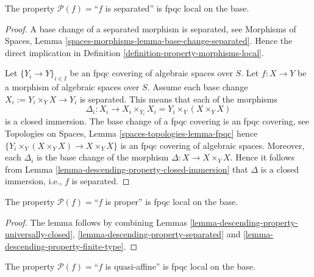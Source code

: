 \begin{lemma}
\label{lemma-descending-property-separated}
The property $\mathcal{P}(f) =$``$f$ is separated''
is fpqc local on the base.
\end{lemma}

\begin{proof}
A base change of a separated morphism is separated, see
Morphisms of Spaces,
Lemma \ref{spaces-morphisms-lemma-base-change-separated}.
Hence the direct implication in
Definition \ref{definition-property-morphisms-local}.

\medskip\noindent
Let $\{Y_i \to Y\}_{i \in I}$ be an fpqc covering of algebraic spaces over $S$.
Let $f : X \to Y$ be a morphism of algebraic spaces over $S$.
Assume each base change $X_i := Y_i \times_Y X \to Y_i$ is separated.
This means that each of the morphisms
$$
\Delta_i :
X_i
\longrightarrow
X_i \times_{Y_i} X_i = Y_i \times_Y (X \times_Y X)
$$
is a closed immersion. The base change of a fpqc covering is an
fpqc covering, see
Topologies on Spaces, Lemma \ref{spaces-topologies-lemma-fpqc}
hence $\{Y_i \times_Y (X \times_Y X) \to X \times_Y X\}$
is an fpqc covering of algebraic spaces. Moreover, each
$\Delta_i$ is the base change of the morphism
$\Delta : X \to X \times_Y X$. Hence it follows from
Lemma \ref{lemma-descending-property-closed-immersion}
that $\Delta$ is a closed immersion, i.e., $f$ is separated.
\end{proof}

\begin{lemma}
\label{lemma-descending-property-proper}
The property $\mathcal{P}(f) =$``$f$ is proper''
is fpqc local on the base.
\end{lemma}

\begin{proof}
The lemma follows by combining
Lemmas \ref{lemma-descending-property-universally-closed},
\ref{lemma-descending-property-separated}
and \ref{lemma-descending-property-finite-type}.
\end{proof}

\begin{lemma}
\label{lemma-descending-property-quasi-affine}
The property $\mathcal{P}(f) =$``$f$ is quasi-affine''
is fpqc local on the base.
\end{lemma}

